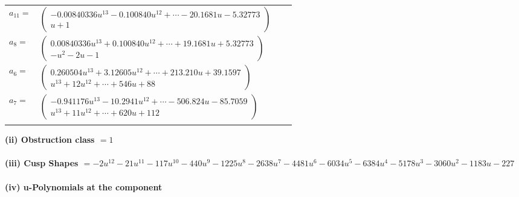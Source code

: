 \documentclass[1p]{elsarticle_modified}
\theoremstyle{definition}
\begin{document}
\begin{tabular}{m{7pt} m{180pt} m{7pt} m{180pt} }
\flushright $a_{11}=$&$\begin{pmatrix}-0.00840336 u^{13}-0.100840 u^{12}+\cdots-20.1681 u-5.32773\\u+1\end{pmatrix}$ \\
\flushright $a_{8}=$&$\begin{pmatrix}0.00840336 u^{13}+0.100840 u^{12}+\cdots+19.1681 u+5.32773\\- u^2-2 u-1\end{pmatrix}$ \\
\flushright $a_{6}=$&$\begin{pmatrix}0.260504 u^{13}+3.12605 u^{12}+\cdots+213.210 u+39.1597\\u^{13}+12 u^{12}+\cdots+546 u+88\end{pmatrix}$ \\
\flushright $a_{7}=$&$\begin{pmatrix}-0.941176 u^{13}-10.2941 u^{12}+\cdots-506.824 u-85.7059\\u^{13}+11 u^{12}+\cdots+620 u+112\end{pmatrix}$\\&\end{tabular}
\flushleft \textbf{(ii) Obstruction class $= 1$}\\~\\
\flushleft \textbf{(iii) Cusp Shapes $= -2 u^{12}-21 u^{11}-117 u^{10}-440 u^9-1225 u^8-2638 u^7-4481 u^6-6034 u^5-6384 u^4-5178 u^3-3060 u^2-1183 u-227$}\\~\\
\newpage\renewcommand{\arraystretch}{1}
\flushleft \textbf{(iv) u-Polynomials at the component}\newline \\
\end{document}
